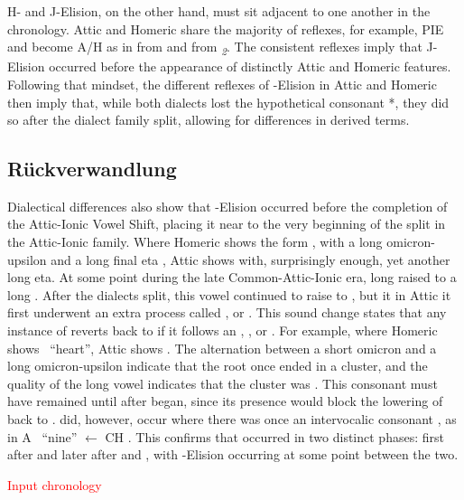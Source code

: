 H- and J-Elision, on the other hand, must sit adjacent to one another in the chronology. Attic and Homeric share the majority of reflexes,\autocite[198]{Smyth_2013} for example, PIE  and  become A/H  as in  from  and  from \textit{\textsubscript{2}}.\autocite[200]{Smyth_2013} The consistent reflexes imply that J-Elision occurred before the appearance of distinctly Attic and Homeric features. Following that mindset, the different reflexes of \W-Elision in Attic and Homeric then imply that, while both dialects lost the hypothetical consonant *\w, they did so after the dialect family split, allowing for differences in derived terms.

\subsection{R\"uckverwandlung}
Dialectical differences also show that \W-Elision occurred before the completion of the Attic-Ionic Vowel Shift, placing it near to the very beginning of the split in the Attic-Ionic family. Where Homeric shows the form , with a long omicron-upsilon  and a long final eta , Attic shows  with, surprisingly enough, yet another long eta. At some point during the late Common-Attic-Ionic era, long  raised to a long \hellenic{/*\ae:/}. After the dialects split, this vowel continued to raise to , but it in Attic it first underwent an extra process called , or . This sound change states that any instance of \hellenic{/*\ae:/} reverts back to  if it follows an , , or . For example, where Homeric shows \ ``heart'', Attic shows . The alternation between a short omicron  and a long omicron-upsilon  indicate that the root once ended in a cluster, and the quality of the long vowel indicates that the cluster was . This consonant must have remained until after  began, since its presence would block the lowering of  back to .  did, however, occur where there was once an intervocalic consonant \hellenic{*\w}, as in A \ ``nine'' $\gets$ CH .\autocite[ἐννέα]{Beekes_2009} This confirms that  occurred in two distinct phases: first after  and later after  and , with \W-Elision occurring at some point between the two.

\noindent\textcolor{red}{Input chronology}
